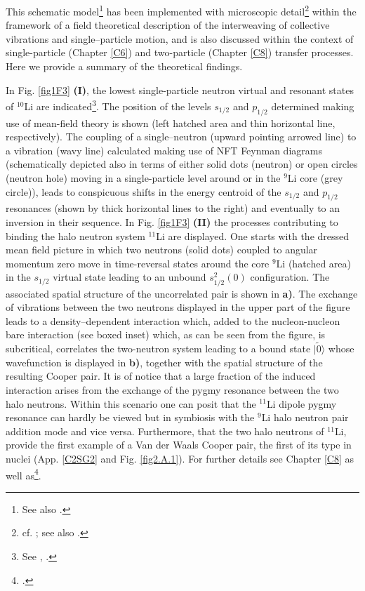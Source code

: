  
 
 This schematic model\footnote{See also \cite{Broglia:19b}.} has been implemented with microscopic detail\footnote{cf. \cite{Barranco:01}; see also \cite{Potel:10}.} within the framework of a field theoretical description of the interweaving of collective vibrations and single--particle motion, and is also discussed  within the context of single-particle (Chapter \ref{C6}) and two-particle (Chapter \ref{C8}) transfer processes. Here we provide a summary of the theoretical findings. 
 
 
 
 
 In Fig. \ref{fig1F3} \textbf{(I)}, the lowest single-particle neutron virtual and resonant states of  $^{10}$Li are indicated\footnote{See \cite{Barranco:20}, \cite{Moro:19}.}. The 
  position of the levels $s_{1/2}$ and $p_{1/2}$ determined making use
 of mean-field theory is shown (left hatched area and thin horizontal
 line, respectively). The coupling of a single--neutron (upward
 pointing arrowed line) to a vibration (wavy line) calculated
 making use of NFT Feynman diagrams 
 (schematically depicted also in terms of either solid dots (neutron)
 or open circles (neutron hole) moving in a single-particle
 level around or in the $^9$Li core (grey circle)), leads to conspicuous
 shifts in the energy centroid of the $s_{1/2}$ and $p_{1/2}$ resonances
 (shown by thick horizontal lines to the right) and eventually to
 an inversion in their sequence. In Fig. \ref{fig1F3} \textbf{(II)} the  processes contributing to  binding the  halo neutron system $^{11}$Li are displayed. One starts with the dressed mean  field
 picture in which two neutrons (solid dots) coupled to angular momentum zero move in
 time-reversal states around the core $^{9}$Li (hatched area) in the
 $s_{1/2}$ virtual state leading to an unbound $s^2
 _{1/2}(0)$ configuration.  The associated spatial structure of the uncorrelated pair is shown in \textbf{a)}. The exchange
 of vibrations between the two neutrons displayed in the upper
 part of the figure leads to a density--dependent interaction
 which, added to the nucleon-nucleon bare interaction (see boxed inset) which, as can be seen from the figure, is subcritical, correlates the
 two-neutron system leading to a bound state $|\tilde 0\rangle$ whose wavefunction is  displayed in \textbf{b)}, together with the spatial structure of the resulting Cooper pair. It is of notice that a large fraction of the induced interaction arises from the exchange of the pygmy resonance between the two halo neutrons.  Within this scenario one can posit that the $^{11}$Li dipole pygmy resonance can hardly be viewed but in symbiosis with the $^{9}$Li halo neutron pair addition mode and vice versa. Furthermore, that the two halo neutrons of $^{11}$Li, provide the first example of a Van der Waals Cooper pair, the first of its type in nuclei (App. \ref{C2SG2} and Fig. \ref{fig2.A.1}). For further details see Chapter \ref{C8} as well as\footnote{\cite{Barranco:01}.}.
 
